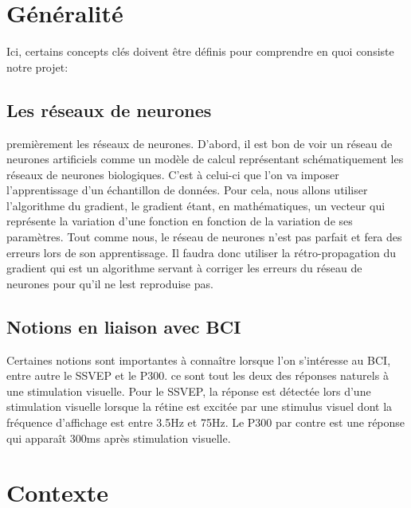 	\section{Généralité} %
	\label{sec:généralité}
	
	Ici, certains concepts clés doivent être définis pour comprendre en quoi consiste notre projet: 
	\subsection{Les réseaux de neurones} %
	\label{sub:les_réseaux_de_neurones}
	premièrement les réseaux de neurones. D'abord, il est bon de voir un réseau de neurones artificiels comme un modèle de calcul représentant schématiquement les réseaux de neurones biologiques. C'est à celui-ci que 
	l'on va imposer l'apprentissage d'un échantillon de données. Pour cela, nous allons 
	utiliser l'algorithme du gradient, le gradient étant, en mathématiques, un vecteur qui
	 représente la variation d'une fonction en fonction de la variation de ses paramètres. Tout
	  comme nous, le réseau de neurones n'est pas parfait et fera des erreurs lors de son 
	  apprentissage. Il faudra donc utiliser la rétro-propagation du gradient qui est un algorithme 
	  servant à corriger les erreurs du réseau de neurones pour qu'il ne lest reproduise pas.

	\subsection{Notions en liaison avec BCI} %
	\label{sub:notion_lien}
	Certaines notions sont importantes à connaître lorsque l'on s’intéresse au BCI, entre autre le SSVEP  et le P300. ce sont tout les deux des réponses naturels à une stimulation visuelle. Pour le SSVEP, la réponse est détectée lors d'une stimulation visuelle lorsque la rétine est excitée par une stimulus visuel dont la fréquence d'affichage est entre 3.5Hz et 75Hz. Le P300 par contre 
	est une réponse qui apparaît 300ms après stimulation visuelle. 
	

	\section{Contexte} %
	\label{sec:contexte}
	
